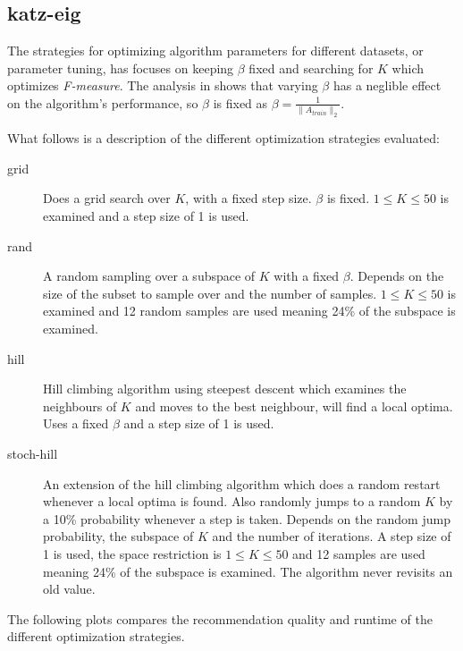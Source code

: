 
\subsection{katz-eig}

The strategies for optimizing algorithm parameters for different datasets, or parameter tuning, has focuses on keeping $\beta$ fixed and searching for $K$ which optimizes \textit{F-measure}. The analysis in  shows that varying $\beta$ has a neglible effect on the algorithm's performance, so $\beta$ is fixed as $\beta = \frac{1}{\|A_{train}\|_2}$.

What follows is a description of the different optimization strategies evaluated:

\begin{description}
    \item[grid]
        Does a grid search over $K$, with a fixed step size. $\beta$ is fixed. $1 \leq K \leq 50$ is examined and a step size of 1 is used.
    \item[rand]
        A random sampling over a subspace of $K$ with a fixed $\beta$. Depends on the size of the subset to sample over and the number of samples. $1 \leq K \leq 50$ is examined and 12 random samples are used meaning 24\% of the subspace is examined.
    \item[hill]
        Hill climbing algorithm using steepest descent which examines the neighbours of $K$ and moves to the best neighbour, will find a local optima. Uses a fixed $\beta$ and a step size of 1 is used.
    \item[stoch-hill]
        An extension of the hill climbing algorithm which does a random restart whenever a local optima is found. Also randomly jumps to a random $K$ by a 10\% probability whenever a step is taken. Depends on the random jump probability, the subspace of $K$ and the number of iterations. A step size of 1 is used, the space restriction is $1 \leq K \leq 50$ and 12 samples are used meaning 24\% of the subspace is examined. The algorithm never revisits an old value.
\end{description}

The following plots compares the recommendation quality and runtime of the different optimization strategies.

